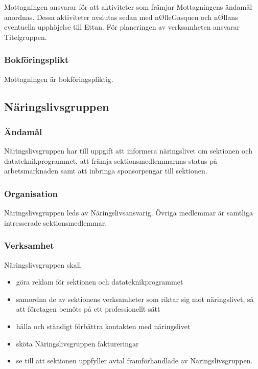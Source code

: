 \documentclass{dgovdoc}
\begin{document}
Mottagningen ansvarar för att aktiviteter som främjar Mottagningens ändamål
anordnas. Dessa aktiviteter avslutas sedan med nØlleGasquen och nØllans
eventuella upphöjelse till Ettan. För planeringen av verksamheten ansvarar
Titelgruppen.

\subsubsection{Bokföringsplikt}

Mottagningen är bokföringspliktig.

\subsection{Näringslivsgruppen}

\subsubsection{Ändamål}

Näringslivsgruppen har till uppgift att informera näringslivet om sektionen och
datateknikprogrammet, att främja sektionsmedlemmarnas status på arbetsmarknaden
samt att inbringa sponsorpengar till sektionen.

\subsubsection{Organisation}

Näringslivsgruppen leds av Näringslivsansvarig. Övriga medlemmar är samtliga
intresserade sektionsmedlemmar.

\subsubsection{Verksamhet}

Näringslivsgruppen skall

\begin{itemize}
  \item göra reklam för sektionen och datateknikprogrammet
  \item samordna de av sektionens verksamheter som riktar sig mot näringslivet,
    så att företagen bemöts på ett professionellt sätt
  \item hålla och ständigt förbättra kontakten med näringslivet
  \item sköta Näringslivsgruppen faktureringar
  \item se till att sektionen uppfyller avtal framförhandlade av
    Näringslivsgruppen.
\end{itemize}
\end{document}
